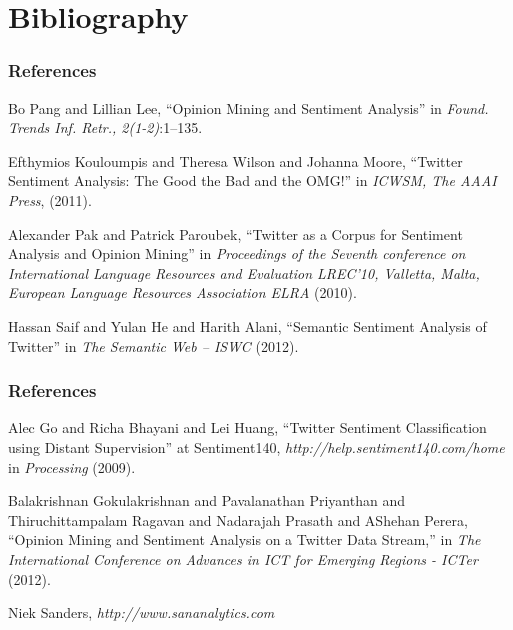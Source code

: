 \documentclass{beamer}
\begin{document}
\section*{Bibliography}

\begin{frame}
\frametitle{References}
\footnotesize{
\begin{thebibliography}{99} %


				Bo Pang and Lillian Lee,
				``Opinion Mining and Sentiment Analysis''
				in \textit{Found. Trends Inf. Retr., 2(1-2)}:1–135.

				Efthymios Kouloumpis and Theresa Wilson and Johanna Moore,
				``Twitter Sentiment Analysis: The Good the Bad and the OMG!''
				in \textit{ICWSM, The AAAI Press}, (2011).

				Alexander Pak and Patrick Paroubek,
				``Twitter as a Corpus for Sentiment Analysis and Opinion Mining''
				in \textit{Proceedings of the Seventh conference on International Language Resources and Evaluation LREC'10,
							Valletta, Malta, European Language Resources Association ELRA} (2010).

				Hassan Saif and Yulan He and Harith Alani,
				``Semantic Sentiment Analysis of Twitter''
				in \textit{The Semantic Web – ISWC} (2012).

\end{thebibliography}
}
\end{frame}


\begin{frame}
\frametitle{References}
\footnotesize{
\begin{thebibliography}{99} %


				Alec Go and Richa Bhayani and Lei Huang,
				``Twitter Sentiment Classification using Distant Supervision''
				at Sentiment140, \textit{http://help.sentiment140.com/home} 
				in \textit{Processing} (2009).

				Balakrishnan Gokulakrishnan and Pavalanathan Priyanthan and
				Thiruchittampalam Ragavan and Nadarajah Prasath and AShehan Perera,
				``Opinion Mining and Sentiment Analysis on a Twitter Data Stream,''
				in \textit{The International Conference on Advances in ICT for Emerging Regions - ICTer} (2012).

				Niek Sanders,
				\textit{http://www.sananalytics.com}

\end{thebibliography}
}
\end{frame}
\end{document}
